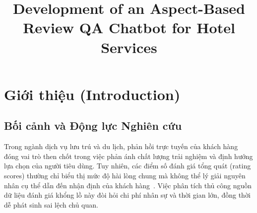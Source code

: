 \documentclass[pdflatex,sn-mathphys-num]{sn-jnl}
\theoremstyle{thmstyleone}
\theoremstyle{thmstyletwo}
\theoremstyle{thmstylethree}
\begin{document}
\title[Development of an Aspect-Based Review QA Chatbot for Hotel Services]
{Development of an Aspect-Based Review QA Chatbot for Hotel Services}

\author*[1]{
 
}

\author[1]{
 
}

\author[1]{
 
}






\maketitle

\section{Giới thiệu (Introduction)}
\label{sec:introduction}

\subsection{Bối cảnh và Động lực Nghiên cứu}
\label{subsec:background}
Trong ngành dịch vụ lưu trú và du lịch, phản hồi trực tuyến của khách hàng đóng vai trò then chốt trong việc phản ánh chất lượng trải nghiệm và định hướng lựa chọn của người tiêu dùng. Tuy nhiên, các điểm số đánh giá tổng quát (rating scores) thường chỉ biểu thị mức độ hài lòng chung mà không thể lý giải nguyên nhân cụ thể dẫn đến nhận định của khách hàng~\cite{namee2023hybrid}. Việc phân tích thủ công nguồn dữ liệu đánh giá khổng lồ này đòi hỏi chi phí nhân sự và thời gian lớn, đồng thời dễ phát sinh sai lệch chủ quan.
\end{document}
